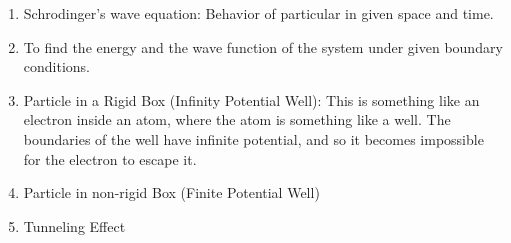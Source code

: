 \documentclass[11pt]{article}
\begin{document}
\begin{enumerate}
	\item 
	Schrodinger's wave equation: Behavior of particular in given space and time.
	\item To find the energy and the wave function of the system under given boundary conditions. 
	
	\item Particle in a Rigid Box (Infinity Potential Well): This is something like an electron inside an atom, where the atom is something like a well. The boundaries of the well have infinite potential, and so it becomes impossible for the electron to escape it. 

	\item Particle in non-rigid Box (Finite Potential Well)
	
	\item Tunneling Effect
\end{enumerate}
\end{document}
